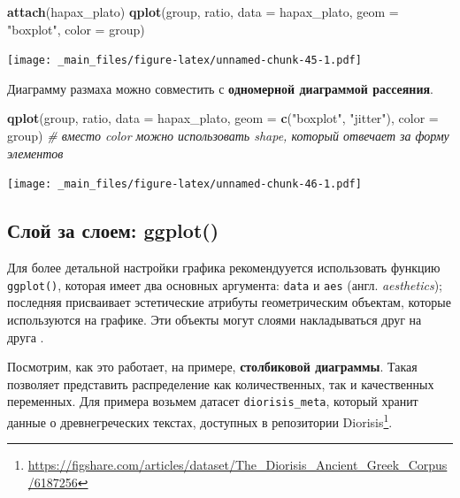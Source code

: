 \documentclass[
]{book}
\newenvironment{Shaded}{\begin{snugshade}}{\end{snugshade}}
\newcommand{\AttributeTok}[1]{\textcolor[rgb]{0.13,0.29,0.53}{#1}}
\newcommand{\CommentTok}[1]{\textcolor[rgb]{0.56,0.35,0.01}{\textit{#1}}}
\newcommand{\FunctionTok}[1]{\textcolor[rgb]{0.13,0.29,0.53}{\textbf{#1}}}
\newcommand{\NormalTok}[1]{#1}
\newcommand{\StringTok}[1]{\textcolor[rgb]{0.31,0.60,0.02}{#1}}
\theoremstyle{definition}
\theoremstyle{definition}
\theoremstyle{definition}
\theoremstyle{definition}
\theoremstyle{remark}
\begin{document}
\begin{Shaded}
\begin{Highlighting}[]
\FunctionTok{attach}\NormalTok{(hapax\_plato)}
\FunctionTok{qplot}\NormalTok{(group, ratio, }\AttributeTok{data =}\NormalTok{ hapax\_plato, }\AttributeTok{geom =} \StringTok{"boxplot"}\NormalTok{, }\AttributeTok{color =}\NormalTok{ group)}
\end{Highlighting}
\end{Shaded}

\texttt{[image: \_main\_files/figure-latex/unnamed-chunk-45-1.pdf]}

Диаграмму размаха можно совместить с \textbf{одномерной диаграммой рассеяния}.

\begin{Shaded}
\begin{Highlighting}[]
\FunctionTok{qplot}\NormalTok{(group, ratio, }\AttributeTok{data =}\NormalTok{ hapax\_plato, }\AttributeTok{geom =} \FunctionTok{c}\NormalTok{(}\StringTok{"boxplot"}\NormalTok{, }\StringTok{"jitter"}\NormalTok{), }\AttributeTok{color =}\NormalTok{ group) }\CommentTok{\# вместо color можно использовать shape, который отвечает за форму элементов}
\end{Highlighting}
\end{Shaded}

\texttt{[image: \_main\_files/figure-latex/unnamed-chunk-46-1.pdf]}

\hypertarget{ux441ux43bux43eux439-ux437ux430-ux441ux43bux43eux435ux43c-ggplot}{%
\subsection{Слой за слоем: ggplot()}\label{ux441ux43bux43eux439-ux437ux430-ux441ux43bux43eux435ux43c-ggplot}}

Для более детальной настройки графика рекомендууется использовать функцию \texttt{ggplot()}, которая имеет два основных аргумента: \texttt{data} и \texttt{aes} (англ. \emph{aesthetics}); последняя присваивает эстетические атрибуты геометрическим объектам, которые используются на графике. Эти объекты могут слоями накладываться друг на друга \citep{wickham2016}.

Посмотрим, как это работает, на примере, \textbf{столбиковой диаграммы}. Такая позволяет представить распределение как количественных, так и качественных переменных. Для примера возьмем датасет \texttt{diorisis\_meta}, который хранит данные о древнегреческих текстах, доступных в репозитории Diorisis\footnote{\url{https://figshare.com/articles/dataset/The_Diorisis_Ancient_Greek_Corpus/6187256}}.
\end{document}
